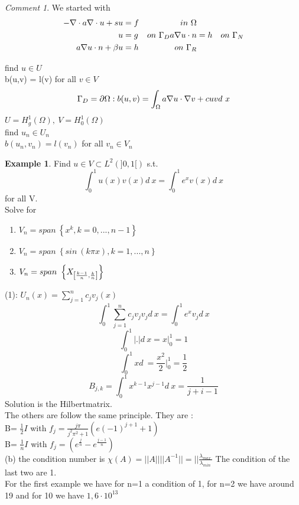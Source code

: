 \documentclass[english]{article}
\theoremstyle{definition}
\newtheorem*{exa}{Example}
\theoremstyle{remark}
\newtheorem*{comm}{Comment}
\newcommand{\f}[2]{\frac{#1}{#2}}							%
\newcommand{\p}{\partial}
\newcommand{\lam}{\lambda}			%
\newcommand{\bb}{\beta}					%
\newcommand{\OO}{\Omega}
\newcommand{\tri}{\nabla}
\begin{document}
\begin{comm}
  We started with 
  \begin{align*}
    -\tri \cdot a \tri \cdot u + su &= f& in\ \OO\\
    u&=g &on\ \GG_D
    a \tri u \cdot n &= h& on\ \GG_N\\
    a\tri u \cdot n + \bb u &= h& on\ \GG_R
  \end{align*}
  
  find $u\in U$\\
  b(u,v) = l(v) for all $v \in V$
  $$\GG_D=\p\OO:b(u,v) = \int_\OO a \tri u \cdot \tri v + cuv d\ x$$
  $U = H^1 _g (\OO), \ V = H^1 _0 (\OO)$
  \\
  find $u_n\in U_n$\\
  $b(u_n,v_n) = l(v_n)$ for all $v_n \in V_n$
  \\
  
  
\end{comm}
\begin{exa}
  Find $u \in V \subset L^2(]0,1[)$ s.t.\\
  $$\int _0 ^1 u(x) v(x) d\ x = \int_0 ^1 e^x v(x) d\ x$$
  for all V.\\
  Solve for 
  \begin{enumerate}
  \item $V_n = span\ \left\{x^k , k=0,...,n-1\right\}$
  \item $V_n = span\ \left\{sin\ (k\pi x) , k=1,...,n\right\}$
  \item $V_n = span\ \left\{ X_{ \left[ {k-1 \over n},{k \over n} \right] } \right\} $
    
  \end{enumerate}
  (1): $U_n(x) = \sum_{j=1}^n c_j v_j (x)$\\
  $$\int_0 ^1 \sum_{j=1}^n c_j v_j v_j d\ x = \int_0 ^1 e^x v_j d\ x$$
  $$\int_0 ^1 | . |d\ x = x|^1 _0 =1$$
  $$\int_0 ^1 x d \  = \f{x^2}{2}|^1 _0 = \f{1}{2}$$
  $$B_{j,k} = \int_0 ^1 x^{k-1} x^{j-1} d\ x = \f{1}{j+i-1}$$
  Solution is the Hilbertmatrix.\\
  The others are follow the same principle. They are :\\
  B= $\f{1}{2} I$ with $f_j = \f{j\pi}{j^2 \pi^2 +1} (e (-1)^{j+1} +1)$\\
  B= $\f{1}{n} I$ with $f_j = (e^{\f{j}{n}} - e^{\f{j-1}{n}})$\\
  (b) the condition number is $\chi (A) = ||A||||A^{-1}||= ||\f{\lam_{max\ }}{\lam_{min\ }}$
  The condition of the last two are 1. \\
  For the first example we have for n=1 a condition of 1, for n=2 we have around 19 and for 10 we have $1,6 \cdot 10^{13}$
\end{exa}
\end{document}
